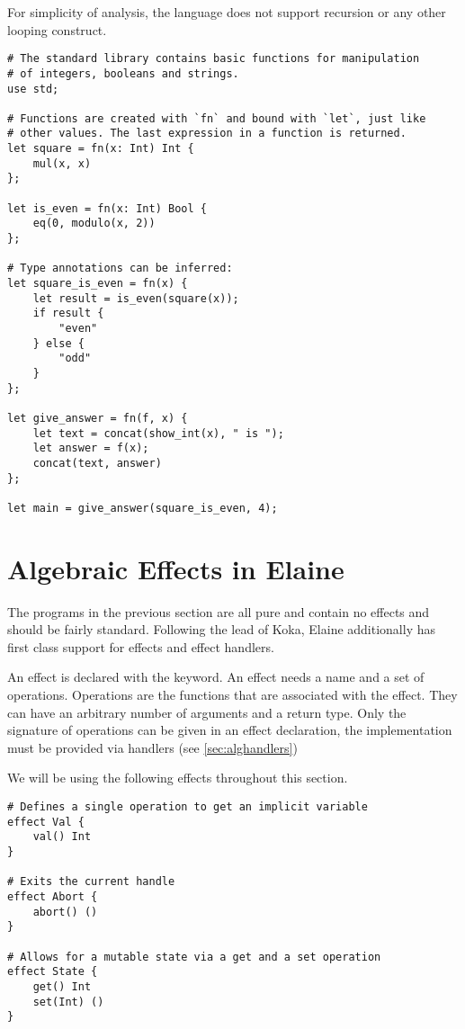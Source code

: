 For simplicity of analysis, the language does not support recursion or any other looping construct.

\begin{lstlisting}[language=elaine, style=fancy]
# The standard library contains basic functions for manipulation
# of integers, booleans and strings.
use std;

# Functions are created with `fn` and bound with `let`, just like
# other values. The last expression in a function is returned.
let square = fn(x: Int) Int {
    mul(x, x)
};

let is_even = fn(x: Int) Bool {
    eq(0, modulo(x, 2))
};

# Type annotations can be inferred:
let square_is_even = fn(x) {
    let result = is_even(square(x));
    if result {
        "even"
    } else {
        "odd"
    }
};

let give_answer = fn(f, x) {
    let text = concat(show_int(x), " is ");
    let answer = f(x);
    concat(text, answer)
};

let main = give_answer(square_is_even, 4);
\end{lstlisting}

\section{Algebraic Effects in Elaine}

The programs in the previous section are all pure and contain no effects and should be fairly standard. Following the lead of Koka\citationneeded, Elaine additionally has first class support for effects and effect handlers.

An effect is declared with the  keyword. An effect needs a name and a set of operations. Operations are the functions that are associated with the effect. They can have an arbitrary number of arguments and a return type. Only the signature of operations can be given in an effect declaration, the implementation must be provided via handlers (see \cref{sec:alghandlers})

We will be using the following effects throughout this section.
\begin{lstlisting}[language=elaine, style=fancy]
# Defines a single operation to get an implicit variable
effect Val {
    val() Int
}

# Exits the current handle
effect Abort {
    abort() ()
}

# Allows for a mutable state via a get and a set operation
effect State {
    get() Int
    set(Int) ()
}
\end{lstlisting}

